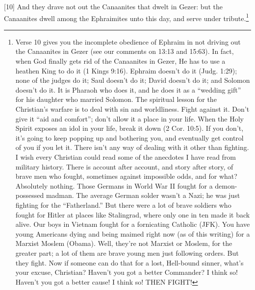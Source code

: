 [10] \textcolor[rgb]{0.00,0.00,1.00}{And they drave not out the Canaanites that dwelt in Gezer: but the Canaanites dwell among the Ephraimites unto this day, and serve under tribute.}\footnote{Verse 10 gives you the incomplete
obedience of Ephraim in not driving out the
Canaanites in Gezer (see our comments on
13:13 and 15:63). In fact, when God finally
gets rid of the Canaanites in Gezer, He has to
use a heathen King to do it (1 Kings 9:16).
Ephraim doesn’t do it (Judg. 1:29); none of the
judges do it; Saul doesn’t do it; David doesn’t
do it; and Solomon doesn’t do it. It is Pharaoh
who does it, and he does it as a “wedding gift”
for his daughter who married Solomon.
The spiritual lesson for the Christian’s
warfare is to deal with sin and worldliness.
Fight against it. Don’t give it “aid and comfort”;
don’t allow it a place in your life. When the
Holy Spirit exposes an idol in your life, break it
down (2 Cor. 10:5). If you don’t, it’s going to
keep popping up and bothering you, and
eventually get control of you if you let it. There
isn’t any way of dealing with it other than
fighting.
I wish every Christian could read some of
the anecdotes I have read from military history.
There is account after account, and story after
story, of brave men who fought, sometimes
against impossible odds, and for what?
Absolutely nothing.
Those Germans in World War II fought for
a demon-possessed madman. The average
German solder wasn’t a Nazi; he was just
fighting for the “Fatherland.” But there were a
lot of brave soldiers who fought for Hitler at
places like Stalingrad, where only one in ten
made it back alive. Our boys in Vietnam fought
for a fornicating Catholic (JFK). You have
young Americans dying and being maimed right
now (as of this writing) for a Marxist Moslem
(Obama). Well, they’re not Marxist or Moslem,
for the greater part; a lot of them are brave
young men just following orders. But they fight.
Now if someone can do that for a lost,
Hell-bound sinner, what’s your excuse,
Christian? Haven’t you got a better
Commander? I think so! Haven’t you got a
better cause! I think so! THEN FIGHT!}

